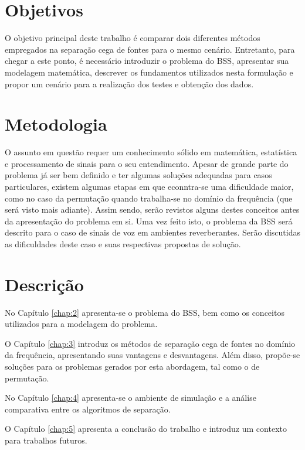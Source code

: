 \section{Objetivos}

O objetivo principal deste trabalho é comparar dois diferentes métodos empregados na separação cega de fontes para o mesmo cenário. Entretanto, para chegar a este ponto, é necessário introduzir o problema do BSS, apresentar sua modelagem matemática, descrever os fundamentos utilizados nesta formulação e propor um cenário para a realização dos testes e obtenção dos dados.


\section{Metodologia}

O assunto em questão requer um conhecimento sólido em matemática, estatística e processamento de sinais para o seu entendimento. Apesar de grande parte do problema já ser bem definido e ter algumas soluções adequadas para casos particulares, existem algumas etapas em que econntra-se uma dificuldade maior, como no caso da permutação quando trabalha-se no domínio da frequência (que será visto mais adiante). Assim sendo, serão revistos alguns destes conceitos antes da apresentação do problema em si. Uma vez feito isto, o problema da BSS será descrito para o caso de sinais de voz em ambientes reverberantes. Serão discutidas as dificuldades deste caso e suas respectivas propostas de solução.


\section{Descrição}

No Capítulo \ref{chap:2} apresenta-se o problema do BSS, bem como os conceitos utilizados para a modelagem do problema.

O Capítulo \ref{chap:3} introduz os métodos de separação cega de fontes no domínio da frequência, apresentando suas vantagens e desvantagens. Além disso, propõe-se soluções para os problemas gerados por esta abordagem, tal como o de permutação.

No Capítulo \ref{chap:4} apresenta-se o ambiente de simulação e a análise comparativa entre os algoritmos de separação.

O Capítulo \ref{chap:5} apresenta a conclusão do trabalho e introduz um contexto para trabalhos futuros.

